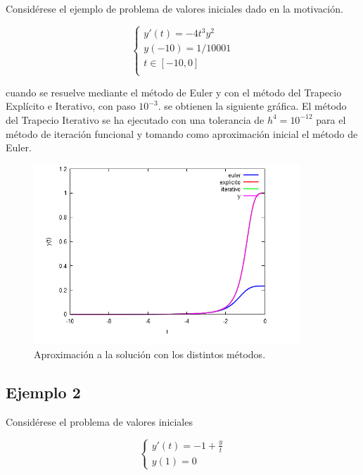 \documentclass{article}
\theoremstyle{theorem-style}  %
\theoremstyle{definition-style}
\theoremstyle{example-style}
\begin{document}
Considérese el ejemplo de problema de valores iniciales dado en la motivación.

		\begin{equation*}
			\begin{cases}
			y'(t) = -4 t^3 y^2 \\
			y(-10) = 1/10001 \\
			t \in [-10,0] \\
			\end{cases}
		\end{equation*}

			cuando se resuelve mediante el método de Euler y con el método del Trapecio Explícito e Iterativo, con paso $10^{-3}$. se obtienen la siguiente gráfica. El método del Trapecio Iterativo se ha ejecutado con una tolerancia de $h^4 = 10^{-12}$ para el método de iteración funcional y tomando como aproximación inicial el método de Euler.

			\begin{figure}[H]
				\centering
				\includegraphics[width=10cm]{./Images/ej1.png}
				\caption{Aproximación a la solución con los distintos métodos.}
				 \label{fig:ej1}
			\end{figure}

\subsection{Ejemplo 2} \label{ejemplo2}

Considérese el problema de valores iniciales

		\begin{equation*}
			\begin{cases}
			y'(t) = -1 + \frac{y}{t} \\
			y(1) = 0
			\end{cases}
		\end{equation*}
\end{document}
